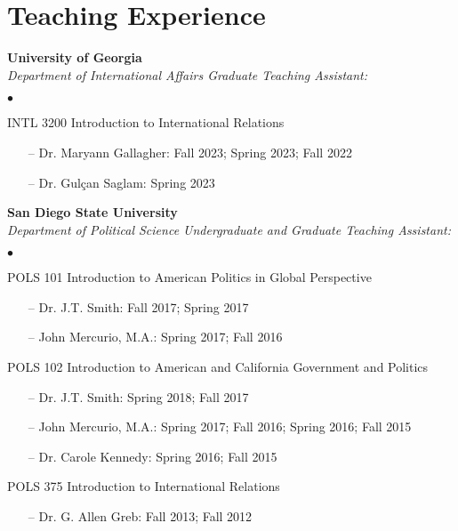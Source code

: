 \documentclass[letterpaper,12pt]{article}
\newenvironment{list2}{
  \begin{list}{$\bullet$}{%
      \setlength{\itemsep}{0in}
      \setlength{\parsep}{0in} \setlength{\parskip}{0in}
      \setlength{\topsep}{0in} \setlength{\partopsep}{0in} 
      \setlength{\leftmargin}{0.5in}}}{\end{list}}
\begin{document}
\section{Teaching Experience}
\textbf{University of Georgia}\\
\textit{Department of International Affairs Graduate Teaching Assistant:}
\begin{list2}
    \item INTL 3200 Introduction to International Relations
        \begin{itemize}
            \item[--] Dr. Maryann Gallagher: Fall 2023; Spring 2023; Fall 2022
            \item[--] Dr. Gulçan Saglam: Spring 2023
        \end{itemize}
\end{list2}
\par
\textbf{San Diego State University}\\
\textit{Department of Political Science Undergraduate and Graduate Teaching Assistant:}
\begin{list2}
    \item POLS 101 Introduction to American Politics in Global Perspective
        \begin{itemize}
            \item[--] Dr. J.T. Smith: Fall 2017; Spring 2017
            \item[--] John Mercurio, M.A.: Spring 2017; Fall 2016
        \end{itemize}
    \item POLS 102 Introduction to American and California Government and Politics
        \begin{itemize}
            \item[--] Dr. J.T. Smith: Spring 2018; Fall 2017
            \item[--] John Mercurio, M.A.: Spring 2017; Fall 2016; Spring 2016; Fall 2015
            \item[--] Dr. Carole Kennedy: Spring 2016; Fall 2015
        \end{itemize}
    \item POLS 375 Introduction to International Relations
        \begin{itemize}
            \item[--] Dr. G. Allen Greb: Fall 2013; Fall 2012
        \end{itemize}
\end{list2}
\par
\end{document}
